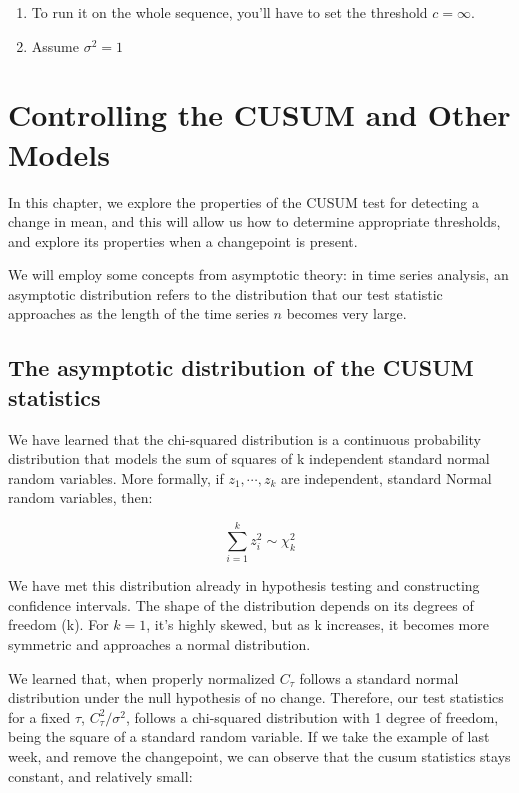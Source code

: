 \documentclass[
  letterpaper,
  DIV=11,
  numbers=noendperiod]{scrreprt}
\begin{document}
\begin{enumerate}
\def\labelenumi{\alph{enumi}.}
\setcounter{enumi}{1}
\item
  To run it on the whole sequence, you'll have to set the threshold
  \(c = \infty\).
\item
  Assume \(\sigma^2 = 1\)
\end{enumerate}


\chapter{Controlling the CUSUM and Other
Models}\label{controlling-the-cusum-and-other-models}

In this chapter, we explore the properties of the CUSUM test for
detecting a change in mean, and this will allow us how to determine
appropriate thresholds, and explore its properties when a changepoint is
present.

We will employ some concepts from asymptotic theory: in time series
analysis, an asymptotic distribution refers to the distribution that our
test statistic approaches as the length of the time series \(n\) becomes
very large.

\section{The asymptotic distribution of the CUSUM
statistics}\label{the-asymptotic-distribution-of-the-cusum-statistics}

We have learned that the chi-squared distribution is a continuous
probability distribution that models the sum of squares of k independent
standard normal random variables. More formally, if \(z_1, \cdots, z_k\)
are independent, standard Normal random variables, then:

\[
\sum_{i=1}^k z^2_i \sim \chi^2_k
\]

We have met this distribution already in hypothesis testing and
constructing confidence intervals. The shape of the distribution depends
on its degrees of freedom (k). For \(k=1\), it's highly skewed, but as k
increases, it becomes more symmetric and approaches a normal
distribution.

We learned that, when properly normalized \(C_\tau\) follows a standard
normal distribution under the null hypothesis of no change. Therefore,
our test statistics for a fixed \(\tau\), \(C_\tau^2/\sigma^2\), follows
a chi-squared distribution with 1 degree of freedom, being the square of
a standard random variable. If we take the example of last week, and
remove the changepoint, we can observe that the cusum statistics stays
constant, and relatively small:
\end{document}
